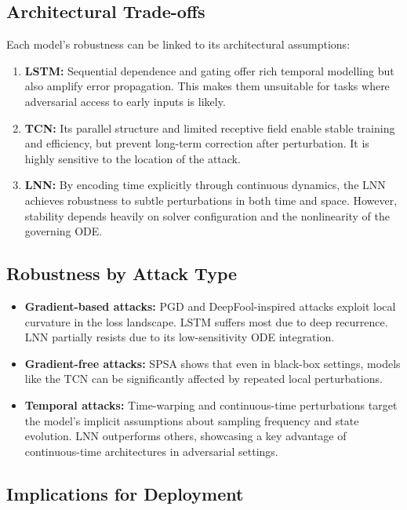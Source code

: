 \subsection*{Architectural Trade-offs}

Each model's robustness can be linked to its architectural assumptions:
\begin{enumerate}
    \item \textbf{LSTM:} Sequential dependence and gating offer rich temporal modelling but also amplify error propagation. This makes them unsuitable for tasks where adversarial access to early inputs is likely.
    \item \textbf{TCN:} Its parallel structure and limited receptive field enable stable training and efficiency, but prevent long-term correction after perturbation. It is highly sensitive to the location of the attack.
    \item \textbf{LNN:} By encoding time explicitly through continuous dynamics, the LNN achieves robustness to subtle perturbations in both time and space. However, stability depends heavily on solver configuration and the nonlinearity of the governing ODE.
\end{enumerate}

\subsection*{Robustness by Attack Type}

\begin{itemize}
    \item \textbf{Gradient-based attacks:} PGD and DeepFool-inspired attacks exploit local curvature in the loss landscape. LSTM suffers most due to deep recurrence. LNN partially resists due to its low-sensitivity ODE integration.
    \item \textbf{Gradient-free attacks:} SPSA shows that even in black-box settings, models like the TCN can be significantly affected by repeated local perturbations.
    \item \textbf{Temporal attacks:} Time-warping and continuous-time perturbations target the model's implicit assumptions about sampling frequency and state evolution. LNN outperforms others, showcasing a key advantage of continuous-time architectures in adversarial settings.
\end{itemize}

\subsection*{Implications for Deployment}

